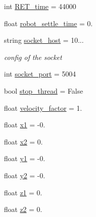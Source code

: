 \begin{DoxyCompactItemize}
int \hyperlink{a00025_a262169df063120aeead2e82d4cdb440c}{R\+E\+T\+\_\+time} = 44000
\item 
float \hyperlink{a00025_aff247d8ee094bb439dbb098e236455cb}{robot\+\_\+settle\+\_\+time} = 0.
\item 
string \hyperlink{a00025_a2014ea8569b3cda02e44e85f8840eba2}{socket\+\_\+host} = \textquotesingle{}10...\textquotesingle{}
\begin{DoxyCompactList}\small\item\em config of the socket \end{DoxyCompactList}\item 
int \hyperlink{a00025_a08c4648fe1aa34a4fd5ad0097d17237f}{socket\+\_\+port} = 5004
\item 
bool \hyperlink{a00025_a94d742b756b055a53df310fd15705ede}{stop\+\_\+thread} = False
\item 
float \hyperlink{a00025_a0fee7ae942bb4b6078c6400331aef6f1}{velocity\+\_\+factor} = 1.
\item 
float \hyperlink{a00025_a3389d8b95846602e8f94cc15f41e48e9}{x1} = -\/0.
\item 
float \hyperlink{a00025_a24d6ffb6e8780eef0c81cd97e3f4fdaf}{x2} = 0.
\item 
float \hyperlink{a00025_a9fe80bf4738047a31d7c162807ed85f0}{y1} = -\/0.
\item 
float \hyperlink{a00025_a07bcd014e69eddcf4243b2a961014eaf}{y2} = -\/0.
\item 
float \hyperlink{a00025_a7da4886c0a2e03b8bb9ed62eb20efb78}{z1} = 0.
\item 
float \hyperlink{a00025_a55196b87940893e540ba636218f4eb07}{z2} = 0.
\end{DoxyCompactItemize}
